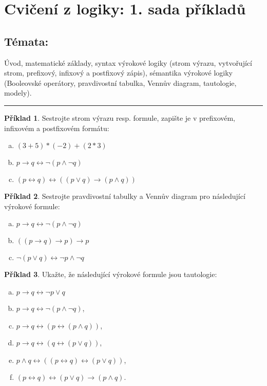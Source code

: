 \documentclass{amsart}
\theoremstyle{definition}
\newtheorem{problem}{Příklad}
\begin{document}
\section*{Cvičení z logiky: 1. sada příkladů}

\bigskip\bigskip

\subsection*{Témata:} 
Úvod, matematické základy, syntax výrokové logiky (strom výrazu, vytvořující strom, prefixový, infixový a postfixový zápis), sémantika výrokové logiky (Booleovské operátory, pravdivostní tabulka, Vennův diagram, tautologie, modely).

\bigskip

\medskip\hrule\medskip

\begin{problem}
Sestrojte strom výrazu resp. formule, zapište je v prefixovém, infixovém a postfixovém formátu:
\begin{enumerate}[(a)]
    \item $(3+5)*(-2)+(2*3)$
    \item $p \to q \leftrightarrow \neg (p \wedge \neg q)$
    \item $(p \leftrightarrow q) \leftrightarrow ((p \vee q) \to (p \wedge q))$
\end{enumerate}
\end{problem}


\smallskip
\begin{problem}
Sestrojte pravdivostní tabulky a Vennův diagram pro následující výrokové formule:
\begin{enumerate}[(a)]
\item $p \to q \leftrightarrow \neg (p \wedge \neg q)$
\item $((p\to q)\to p)\to p$
\item $\neg (p\vee q)\leftrightarrow \neg p\wedge \neg q$
\end{enumerate}
\end{problem}


\smallskip
\begin{problem}
Ukažte, že následující výrokové formule jsou tautologie:
\begin{enumerate}[(a)]
    \item $p \to q \leftrightarrow \neg p \vee q$
    \item $p \to q \leftrightarrow \neg (p \wedge \neg q)$,
    \item $p \to q \leftrightarrow (p \leftrightarrow (p\wedge q))$,
    \item $p \to q \leftrightarrow (q \leftrightarrow (p\vee q))$,
    \item $p \wedge q \leftrightarrow ((p \leftrightarrow q) \leftrightarrow (p \vee q))$,
    \item $(p \leftrightarrow q) \leftrightarrow (p \vee q) \to (p \wedge q)$.
\end{enumerate}
\end{problem}
\end{document}
